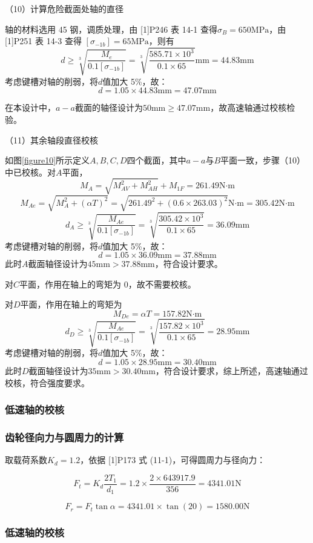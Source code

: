 \documentclass[12pt]{ctexart}
\begin{document}
（10）计算危险截面处轴的直径

轴的材料选用 45 钢，调质处理，由 [1]P246 表 14-1 查得$\sigma_B=650\text{MPa}$，由 [1]P251 表 14-3 查得 $[\sigma_{-1b}]=65\text{MPa}$，则有
$$d\ge \sqrt[3]{\frac{M_e}{0.1[\sigma_{-1b}]}}=\sqrt[3]{\frac{585.71\times 10^3}{0.1\times 65}}\text{mm}=44.83\text{mm}$$
考虑键槽对轴的削弱，将$d$值加大 5\%，故：
$$d=1.05\times 44.83\text{mm}=47.07\text{mm}$$

在本设计中，$a-a$截面的轴径设计为$50\text{mm}\ge 47.07\text{mm}$，故高速轴通过校核检验。

（11）其余轴段直径校核

如图\ref{figure10}所示定义$A,B,C,D$四个截面，其中$a-a$与$B$平面一致，步骤（10）中已校核。对$A$平面，
$$M_A=\sqrt{M_{AV}^2+M_{AH}^2}+M_{1F}=261.49\text{N·m}$$
$$M_{Ae}=\sqrt{M_A^2+(\alpha T)^2}=\sqrt{261.49^2+(0.6\times 263.03)^2}\text{N·m}=305.42\text{N·m}$$
$$d_A\ge \sqrt[3]{\frac{M_{Ae}}{0.1[\sigma_{-1b}]}}=\sqrt[3]{\frac{305.42\times 10^3}{0.1\times 65}}=36.09\text{mm}$$
考虑键槽对轴的削弱，将$d$值加大 5\%，故：
$$d=1.05\times 36.09\text{mm}=37.88\text{mm}$$ 
此时$A$截面轴径设计为$45\text{mm}> 37.88\text{mm}$，符合设计要求。

对$C$平面，作用在轴上的弯矩为 0，故不需要校核。

对$D$平面，作用在轴上的弯矩为
$$M_{De}=\alpha T=157.82\text{N·m}$$
$$d_D \ge \sqrt[3]{\frac{M_{Ae}}{0.1[\sigma_{-1b}]}}=\sqrt[3]{\frac{157.82\times 10^3}{0.1\times 65}}=28.95\text{mm}$$
考虑键槽对轴的削弱，将$d$值加大 5\%，故：
$$d=1.05\times 28.95\text{mm}=30.40\text{mm}$$ 
此时$D$截面轴径设计为$35\text{mm}> 30.40\text{mm}$，符合设计要求，综上所述，高速轴通过校核，符合强度要求。

\subsubsection{低速轴的校核}

\subsubsection{齿轮径向力与圆周力的计算}

取载荷系数$K_d=1.2$，依据 [1]P173 式 (11-1)，可得圆周力与径向力：

$$F_t=K_d\frac{2T_1}{d_1}=1.2\times \frac{2\times 643917.9}{356}=4341.01\text{N}$$

$$F_r=F_t\tan{\alpha} = 4341.01\times \tan(20)=1580.00\text{N}$$

\subsubsection{低速轴的校核}
\end{document}
